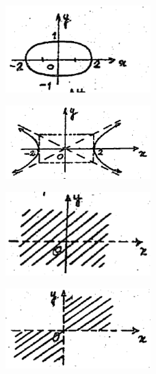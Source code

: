 \documentclass[11pt]{amsbook}
\begin{document}
    \begin{figure}[htbp]
        \centering
            \begin{minipage}{.5\textwidth}
            \centering
            \includegraphics[width=0.5\textwidth]{images/b1p1-113-fig03.pdf}
            \label{fig:test1}
        \end{minipage}%
        \begin{minipage}{.5\textwidth}
            \centering
            \includegraphics[width=0.5\textwidth]{images/b1p1-113-fig04.pdf}
            \label{fig:test2}
        \end{minipage}
    \end{figure}
    \begin{figure}[htbp]
        \centering
            \begin{minipage}{.5\textwidth}
            \centering
            \includegraphics[width=0.5\textwidth]{images/b1p1-113-fig05.pdf}
            \label{fig:test1}
        \end{minipage}%
        \begin{minipage}{.5\textwidth}
            \centering
            \includegraphics[width=0.5\textwidth]{images/b1p1-113-fig06.pdf}
            \label{fig:test2}
        \end{minipage}
    \end{figure}
\end{document}
